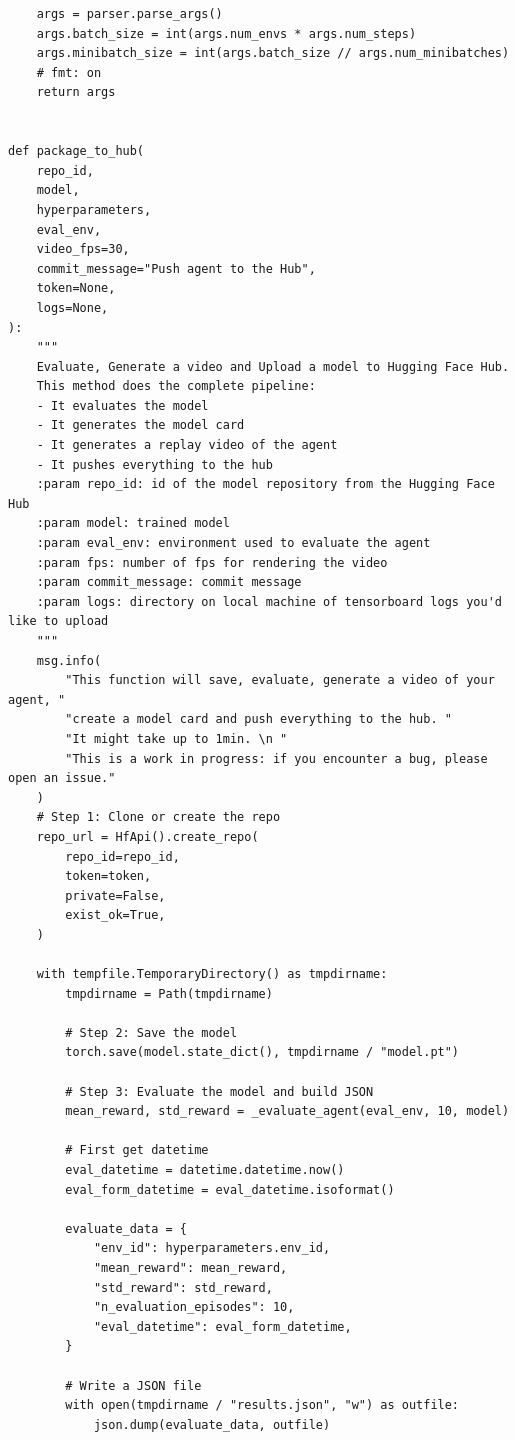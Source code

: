 \documentclass[11pt,a4paper]{article}
\begin{document}
\begin{lstlisting}
    args = parser.parse_args()
    args.batch_size = int(args.num_envs * args.num_steps)
    args.minibatch_size = int(args.batch_size // args.num_minibatches)
    # fmt: on
    return args


def package_to_hub(
    repo_id,
    model,
    hyperparameters,
    eval_env,
    video_fps=30,
    commit_message="Push agent to the Hub",
    token=None,
    logs=None,
):
    """
    Evaluate, Generate a video and Upload a model to Hugging Face Hub.
    This method does the complete pipeline:
    - It evaluates the model
    - It generates the model card
    - It generates a replay video of the agent
    - It pushes everything to the hub
    :param repo_id: id of the model repository from the Hugging Face Hub
    :param model: trained model
    :param eval_env: environment used to evaluate the agent
    :param fps: number of fps for rendering the video
    :param commit_message: commit message
    :param logs: directory on local machine of tensorboard logs you'd like to upload
    """
    msg.info(
        "This function will save, evaluate, generate a video of your agent, "
        "create a model card and push everything to the hub. "
        "It might take up to 1min. \n "
        "This is a work in progress: if you encounter a bug, please open an issue."
    )
    # Step 1: Clone or create the repo
    repo_url = HfApi().create_repo(
        repo_id=repo_id,
        token=token,
        private=False,
        exist_ok=True,
    )

    with tempfile.TemporaryDirectory() as tmpdirname:
        tmpdirname = Path(tmpdirname)

        # Step 2: Save the model
        torch.save(model.state_dict(), tmpdirname / "model.pt")

        # Step 3: Evaluate the model and build JSON
        mean_reward, std_reward = _evaluate_agent(eval_env, 10, model)

        # First get datetime
        eval_datetime = datetime.datetime.now()
        eval_form_datetime = eval_datetime.isoformat()

        evaluate_data = {
            "env_id": hyperparameters.env_id,
            "mean_reward": mean_reward,
            "std_reward": std_reward,
            "n_evaluation_episodes": 10,
            "eval_datetime": eval_form_datetime,
        }

        # Write a JSON file
        with open(tmpdirname / "results.json", "w") as outfile:
            json.dump(evaluate_data, outfile)


\end{lstlisting}
\end{document}
